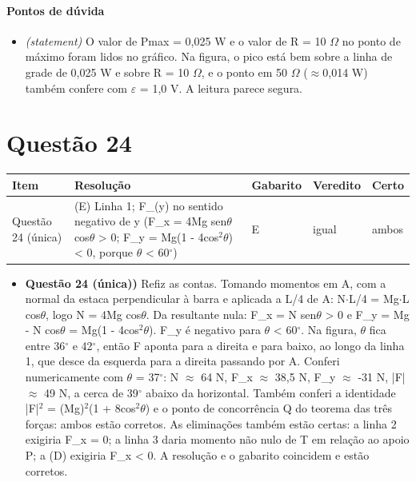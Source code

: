 \documentclass{article}%
\begin{document}
\paragraph{Pontos de dúvida}%
\begin{itemize}%
\item%
\textit{(statement)} O valor de Pmax = 0,025 W e o valor de R = 10 $\Omega$ no ponto de máximo foram lidos no gráfico. Na figura, o pico está bem sobre a linha de grade de 0,025 W e sobre R = 10 $\Omega$, e o ponto em 50 $\Omega$ ($\approx$0,014 W) também confere com $\varepsilon$ = 1,0 V. A leitura parece segura.%
\end{itemize}%
\section*{Questão 24}%
\begin{longtable}{@{}p{} p{} p{} p{} p{}@{}}\toprule Item & Resolução & Gabarito & Veredito & Certo \\ \midrule
Questão 24 (única) & (E) Linha 1; F\_(y) no sentido negativo de y (F\_x = 4Mg sen$\theta$ cos$\theta$ > 0; F\_y = Mg(1 - 4cos$^2$$\theta$) < 0, porque $\theta$ < 60$^\circ$) & E & igual & ambos \\
\bottomrule\end{longtable}%
\begin{itemize}%
\item%
\textbf{Questão 24 (única))} Refiz as contas. Tomando momentos em A, com a normal da estaca perpendicular à barra e aplicada a L/4 de A: N$\cdot$L/4 = Mg$\cdot$L cos$\theta$, logo N = 4Mg cos$\theta$. Da resultante nula: F\_x = N sen$\theta$ > 0 e F\_y = Mg - N cos$\theta$ = Mg(1 - 4cos$^2$$\theta$). F\_y é negativo para $\theta$ < 60$^\circ$. Na figura, $\theta$ fica entre 36$^\circ$ e 42$^\circ$, então F aponta para a direita e para baixo, ao longo da linha 1, que desce da esquerda para a direita passando por A. Conferi numericamente com $\theta$ = 37$^\circ$: N $\approx$ 64 N, F\_x $\approx$ 38,5 N, F\_y $\approx$ -31 N, |F| $\approx$ 49 N, a cerca de 39$^\circ$ abaixo da horizontal. Também conferi a identidade |F|$^2$ = (Mg)$^2$(1 + 8cos$^2$$\theta$) e o ponto de concorrência Q do teorema das três forças: ambos estão corretos. As eliminações também estão certas: a linha 2 exigiria F\_x = 0; a linha 3 daria momento não nulo de T em relação ao apoio P; a (D) exigiria F\_x < 0. A resolução e o gabarito coincidem e estão corretos.%
\end{itemize}%
\end{document}
